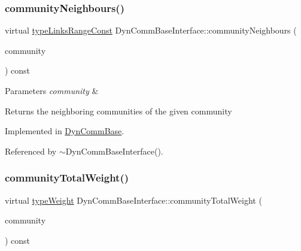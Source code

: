 \subsubsection{\texorpdfstring{community\+Neighbours()}{communityNeighbours()}}
{\footnotesize\ttfamily virtual \hyperlink{graphInterface_8h_ae8d27008f15586bbf419af7ad2e0a48a}{type\+Links\+Range\+Const} Dyn\+Comm\+Base\+Interface\+::community\+Neighbours (\begin{DoxyParamCaption}\item[{\hyperlink{graphUndirectedGroupable_8h_a914da95c9ea7f14f4b7f875c36818556}{type\+Community}}]{community }\end{DoxyParamCaption}) const\hspace{0.3cm}{\ttfamily [pure virtual]}}


\begin{DoxyParams}{Parameters}
{\em community} & \\
\hline
\end{DoxyParams}
\begin{DoxyReturn}{Returns}
the neighboring communities of the given community 
\end{DoxyReturn}


Implemented in \hyperlink{classDynCommBase_aba6f1f0fdd67a1d7f546d63706a60cde}{Dyn\+Comm\+Base}.



Referenced by $\sim$\+Dyn\+Comm\+Base\+Interface().

\mbox{\label{classDynCommBaseInterface_a06e0b8a06e9c1067e12f574458db3eb0}} 
\subsubsection{\texorpdfstring{community\+Total\+Weight()}{communityTotalWeight()}}
{\footnotesize\ttfamily virtual \hyperlink{edge_8h_a2e7ea3be891ac8b52f749ec73fee6dd2}{type\+Weight} Dyn\+Comm\+Base\+Interface\+::community\+Total\+Weight (\begin{DoxyParamCaption}\item[{\hyperlink{graphUndirectedGroupable_8h_a914da95c9ea7f14f4b7f875c36818556}{type\+Community}}]{community }\end{DoxyParamCaption}) const\hspace{0.3cm}{\ttfamily [pure virtual]}}


